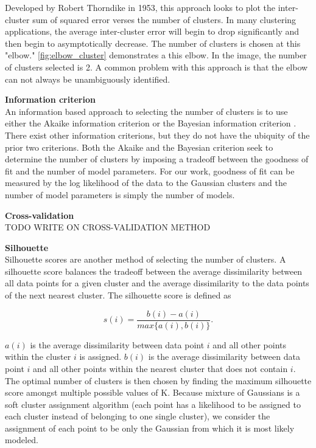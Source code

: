 Developed by Robert Thorndike \cite{Thorndike1953} in 1953, this approach looks to plot the inter-cluster sum of squared error verses the number of clusters.  In many clustering applications, the average inter-cluster error will begin to drop significantly and then begin to asymptotically decrease.  The number of clusters is chosen at this "elbow."  \ref{fig:elbow_cluster} demonstrates a this elbow.  In the image, the number of clusters selected is 2.  A common problem with this approach is that the elbow can not always be unambiguously identified.

\bigskip
\noindent
\textbf{Information criterion} \\
An information based approach to selecting the number of clusters is to use either the Akaike information criterion \cite{Akaike1974} or the Bayesian information criterion \cite{Schwarz1978}.  There exist other information criterions, but they do not have the ubiquity of the prior two criterions.  Both the Akaike and the Bayesian criterion seek to determine the number of clusters by imposing a tradeoff between the goodness of fit and the number of model parameters.  For our work, goodness of fit can be measured by the log likelihood of the data to the Gaussian clusters and the number of model parameters is simply the number of models.  

\bigskip
\noindent
\textbf{Cross-validation} \\
TODO WRITE ON CROSS-VALIDATION METHOD


\bigskip
\noindent
\textbf{Silhouette} \\
Silhouette \cite{Rousseuw1987} scores are another method of selecting the number of clusters.  A silhouette score balances the tradeoff between the average dissimilarity between all data points for a given cluster and the average dissimilarity to the data points of the next nearest cluster.  The silhouette score is defined as

\begin{equation}
s(i) = \frac{b(i) - a(i)}{max\{a(i), b(i)\}}.
\end{equation}

$a(i)$ is the average dissimilarity between data point $i$ and all other points within the cluster $i$ is assigned.  $b(i)$ is the average dissimilarity between data point $i$ and all other points within the nearest cluster that does not contain $i$.  The optimal number of clusters is then chosen by finding the maximum silhouette score amongst multiple possible values of K.  Because mixture of Gaussians is a soft cluster assignment algorithm (each point has a likelihood to be assigned to each cluster instead of belonging to one single cluster), we consider the assignment of each point to be only the Gaussian from which it is most likely modeled.

